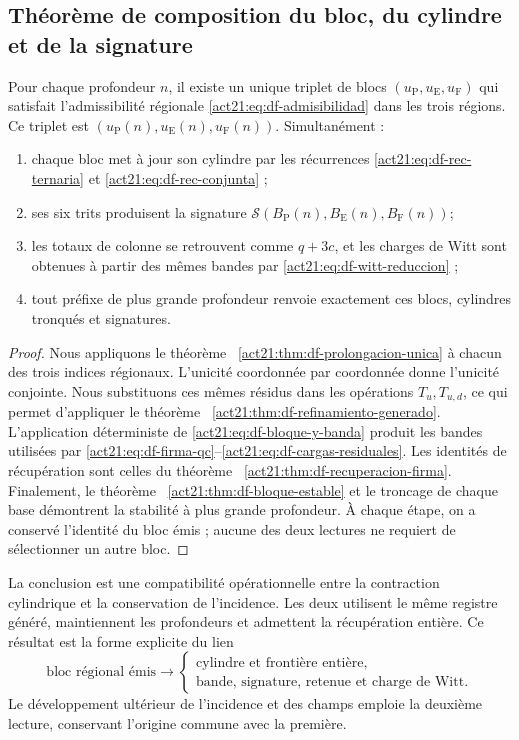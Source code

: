 \subsection{Théorème de composition du bloc, du cylindre et de la signature}

\begin{theorem}
\label{act21:thm:df-composicion-conjunta}
Pour chaque profondeur \(n\), il existe un unique triplet de blocs
\((u_{\mathrm P},u_{\mathrm E},u_{\mathrm F})\) qui satisfait
l'admissibilité régionale \eqref{act21:eq:df-admisibilidad} dans les trois régions.
Ce triplet est \((u_{\mathrm P}(n),u_{\mathrm E}(n),u_{\mathrm F}(n))\).
Simultanément :
\begin{enumerate}
\item chaque bloc met à jour son cylindre par les récurrences
\eqref{act21:eq:df-rec-ternaria} et \eqref{act21:eq:df-rec-conjunta} ;
\item ses six trits produisent la signature
\(\mathcal S(B_{\mathrm P}(n),B_{\mathrm E}(n),B_{\mathrm F}(n))\);
\item les totaux de colonne se retrouvent comme \(q+3c\), et les charges de Witt sont obtenues à partir des mêmes bandes par
\eqref{act21:eq:df-witt-reduccion} ;
\item tout préfixe de plus grande profondeur renvoie exactement ces
blocs, cylindres tronqués et signatures.
\end{enumerate}
\end{theorem}

\begin{proof}
Nous appliquons le théorème ~\ref{act21:thm:df-prolongacion-unica} à chacun des trois
indices régionaux. L'unicité coordonnée par coordonnée donne l'unicité
conjointe. Nous substituons ces mêmes résidus dans les opérations
\(T_u,T_{u,d}\), ce qui permet d'appliquer le
théorème ~\ref{act21:thm:df-refinamiento-generado}. L'application déterministe de
\eqref{act21:eq:df-bloque-y-banda} produit les bandes utilisées par
\eqref{act21:eq:df-firma-qc}--\eqref{act21:eq:df-cargas-residuales}. Les identités
de récupération sont celles du théorème ~\ref{act21:thm:df-recuperacion-firma}.
Finalement, le théorème ~\ref{act21:thm:df-bloque-estable} et le troncage de
chaque base démontrent la stabilité à plus grande profondeur. À chaque étape, on a conservé l'identité du bloc émis ; aucune des deux
lectures ne requiert de sélectionner un autre bloc.
\end{proof}

La conclusion est une compatibilité opérationnelle entre la contraction
cylindrique et la conservation de l'incidence. Les deux utilisent le même
registre généré, maintiennent les profondeurs et admettent la récupération
entière. Ce résultat est la forme explicite du lien
\[
 \text{bloc régional émis}
 \longrightarrow
 \begin{cases}
 \text{cylindre et frontière entière},\\
 \text{bande, signature, retenue et charge de Witt}.
 \end{cases}
\]
Le développement ultérieur de l'incidence et des champs emploie la deuxième lecture, conservant l'origine commune avec la première.
